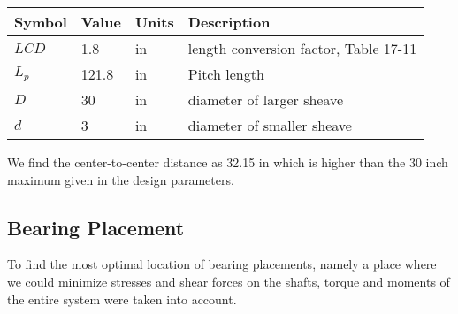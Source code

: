 \documentclass[letterpaper,12pt]{article}
\begin{document}
\begin{center}
	\begin{tabular}{ |p{1.5cm}||p{1cm}|p{2cm}|p{7cm}|  }
		\hline
		Symbol & Value & Units & Description\\
		\hline
		$LCD$ &1.8& in & length conversion factor, Table 17-11\\
		$L_p$ & 121.8 & in & Pitch length \\
        $D$ & 30 & in  & diameter of larger sheave\\			
		$d$ & 3 & in  & diameter of smaller sheave\\
		\hline
	\end{tabular}
\end{center}
We find the center-to-center distance as 32.15 in which is higher than the 30 inch maximum given in the design parameters.

\subsection{Bearing Placement}
To find the most optimal location of bearing placements, namely a place where we could minimize stresses and shear forces on the shafts, torque and moments of the entire system were taken into account.
\end{document}
